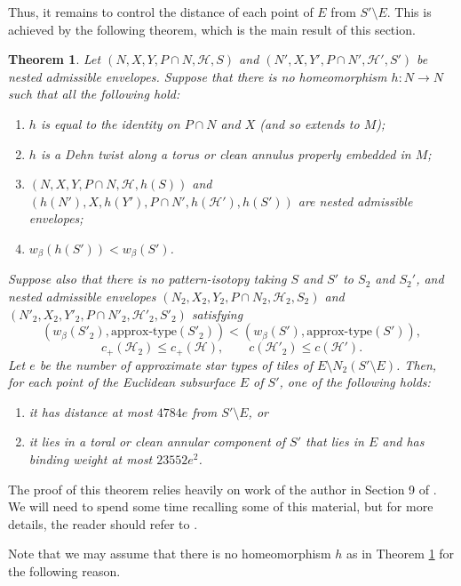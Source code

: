 \documentclass[oneside]{amsart}
\numberwithin{equation}{section}
\theoremstyle{plain}
\newtheorem{theorem}[equation]{Theorem}
\theoremstyle{definition}
\begin{document}
Thus, it remains to control the distance of each point of $E$ from $S' \setminus E$. This is achieved by the following
theorem, which is the main result of this section.

\begin{theorem}
\label{Thm:DistanceToBoundaryEuclidean}
Let $(N, X, Y, P \cap N, \mathcal{H}, S)$ and 
$(N', X, Y', P \cap N', \mathcal{H}', S')$ be
nested admissible envelopes. Suppose that there is no homeomorphism $h \colon N \rightarrow N$
such that all the following hold:
\begin{enumerate}
\item $h$ is equal to the identity on $P \cap N$ and $X$ (and so extends to $M$);
\item $h$ is a Dehn twist along a torus or clean annulus properly embedded in $M$;
\item $(N, X, Y, P \cap N, \mathcal{H}, h(S))$ and $(h(N'), X, h(Y'), P \cap N', h(\mathcal{H}'), h(S'))$ are nested admissible envelopes;
\item $w_\beta(h(S')) < w_\beta(S')$.
\end{enumerate}
Suppose also
that there is no pattern-isotopy taking $S$ and $S'$ to $S_2$ and $S_2'$, and
nested admissible envelopes
$(N_2, X_2, Y_2, P \cap N_2, \mathcal{H}_2, S_2)$ and $(N'_2, X_2, Y'_2, P \cap N'_2, \mathcal{H}'_2, S'_2)$ satisfying
$$(w_\beta(S'_2), \text{approx-type}(S'_2)) < (w_\beta(S'), \text{approx-type}(S')),$$
$$c_+(\mathcal{H}_2) \leq c_+(\mathcal{H}), \qquad c(\mathcal{H}'_2) \leq c(\mathcal{H}').$$
Let $e$ be the number of approximate star types of tiles of $E \setminus N_2(S' \setminus E)$.
Then, for each point of the Euclidean subsurface $E$ of $S'$, one of the following holds:
\begin{enumerate}
\item it has distance at most $4784e$ from $S' \setminus E$, or
\item it lies in a toral or clean annular component of $S'$ that lies in $E$ and has binding weight at most $23552 e^2$.
\end{enumerate}
\end{theorem}

The proof of this theorem relies heavily on work of the author in Section 9 of \cite{Lackenby:PolyUnknot}.
We will need to spend some time recalling some of this material, but for more details,
the reader should refer to \cite{Lackenby:PolyUnknot}.

Note that we may assume that there is no homeomorphism $h$ as in Theorem \ref{Thm:DistanceToBoundaryEuclidean} for the following reason.
\end{document}

